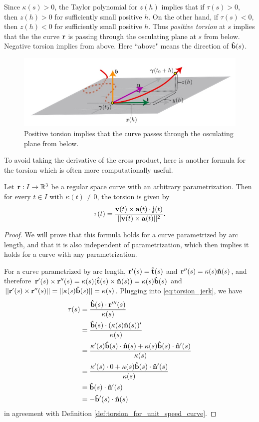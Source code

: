 \documentclass[12pt,letterpaper,reqno]{article}
\numberwithin{equation}{section}
\newcommand{\bv}{{\bf v}}
\newcommand{\ba}{{\bf a}}
\newcommand{\bbr}{{\bf r}}
\newcommand{\ut}{{\bf {\hat{t}}}}
\newcommand{\un}{{\bf {\hat{n}}}}
\newcommand{\ub}{{\bf {\hat{b}}}}
\newcommand{\bj}{{\bf j}}
\begin{document}
{Since $\kappa(s)>0$, the Taylor polynomial for $z(h)$ implies that if $\tau(s)>0$, then $z(h)>0$ for sufficiently small positive $h$. On the other hand, if $\tau(s)<0$, then $z(h)<0$ for sufficiently small positive $h$. Thus \emph{positive torsion} at $s$ implies that the the curve $\bbr$ is passing through the osculating plane at $s$ from below. Negative torsion implies from above. Here ``above" means the direction of $\ub(s)$.

\begin{figure}[h]
	\begin{center}
		\includegraphics[scale=0.4]{figures_mvc/positive_torsion}
	\end{center}
	\caption{Positive torsion implies that the curve passes through the osculating plane from below.}
\end{figure}

To avoid taking the derivative of the cross product, here is another formula for the torsion which is often more computationally useful.

\begin{prop}
	Let $\bbr:I \to \mathbb{R}^3$ be a regular space curve with an arbitrary parametrization. Then for every $t \in I$ with $\kappa(t) \neq 0$, the torsion is given by
	\begin{align}\label{eq:torsion_jerk}
		\tau(t)=\frac{\bv(t) \times \ba(t)\cdot \bj(t)}{||\bv(t) \times \ba(t)||^2}.
	\end{align}
\end{prop}

\begin{proof}
	We will prove that this formula holds for a curve parametrized by arc length, and that it is also independent of parametrization, which then implies it holds for a curve with any parametrization.
	
	For a curve parametrized by arc length, $\bbr'(s)=\ut(s)$ and $\bbr''(s)=\kappa(s)\un(s)$, and therefore $\bbr'(s) \times \bbr''(s)=\kappa(s)(\ut(s) \times \un(s))=\kappa(s)\ub(s)$ and $||\bbr'(s) \times \bbr''(s)||=||\kappa(s)\ub(s)||=\kappa(s)$. Plugging into \eqref{eq:torsion_jerk}, we have
	\begin{align*}
		\tau(s)&=\frac{\ub(s) \cdot \bbr'''(s)}{\kappa(s)} \\
		&=\frac{\ub(s) \cdot (\kappa(s) \un(s))'}{\kappa(s)} \\
		&=\frac{\kappa'(s) \ub(s)\cdot \un(s)+\kappa(s)\ub(s)\cdot\un'(s)}{\kappa(s)} \\
		&=\frac{\kappa'(s) \cdot 0+\kappa(s)\ub(s)\cdot\un'(s)}{\kappa(s)} \\
		&=\ub(s) \cdot \un'(s) \\
		&=-\ub'(s) \cdot \un(s)
	\end{align*}
in agreement with Definition \ref{def:torsion_for_unit_speed_curve}.


\end{proof}}
\end{document}
